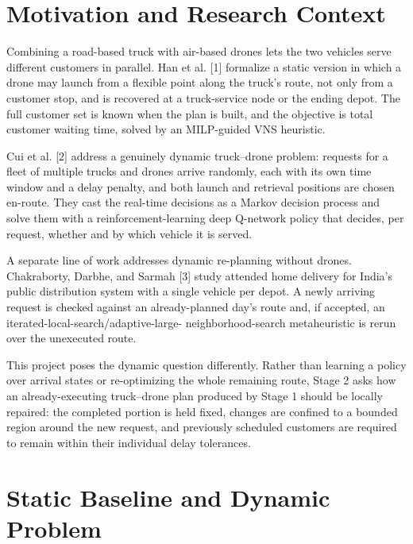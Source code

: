\documentclass[10pt,a4paper]{article}
\begin{document}
\section{Motivation and Research Context}

Combining a road-based truck with air-based drones lets the two
vehicles serve different customers in parallel. Han et al. [1]
formalize a static version in which a drone may launch from a flexible
point along the truck's route, not only from a customer stop, and is
recovered at a truck-service node or the ending depot. The full
customer set is known when the plan is built, and the objective is
total customer waiting time, solved by an MILP-guided VNS heuristic.

Cui et al. [2] address a genuinely dynamic truck--drone problem:
requests for a fleet of multiple trucks and drones arrive randomly,
each with its own time window and a delay penalty, and both launch and
retrieval positions are chosen en-route. They cast the real-time
decisions as a Markov decision process and solve them with a
reinforcement-learning deep Q-network policy that decides, per
request, whether and by which vehicle it is served.

A separate line of work addresses dynamic re-planning without drones.
Chakraborty, Darbhe, and Sarmah [3] study attended home delivery for
India's public distribution system with a single vehicle per depot.
A newly arriving request is checked against an already-planned day's
route and, if accepted, an iterated-local-search/adaptive-large-
neighborhood-search metaheuristic is rerun over the unexecuted route.

This project poses the dynamic question differently. Rather than
learning a policy over arrival states or re-optimizing the whole
remaining route, Stage 2 asks how an already-executing truck--drone
plan produced by Stage 1 should be locally repaired: the completed
portion is held fixed, changes are confined to a bounded region around
the new request, and previously scheduled customers are required to
remain within their individual delay tolerances.

\section{Static Baseline and Dynamic Problem}
\end{document}
